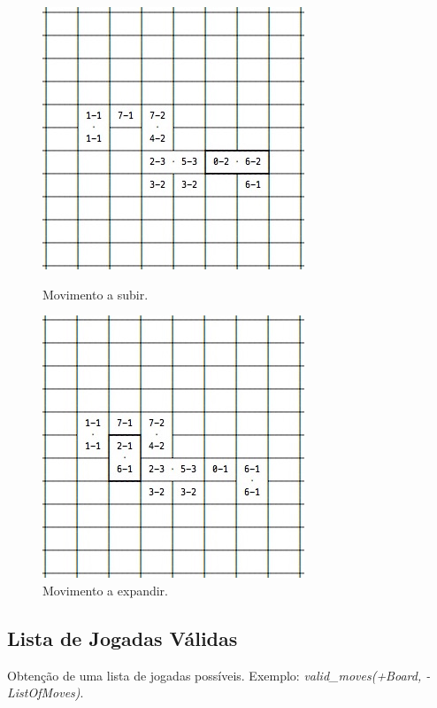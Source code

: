 \documentclass[a4paper]{article}
\begin{document}
\begin{figure}[ht]
 \begin{minipage}[t]{.5\textwidth}
	\begin{center}
		\includegraphics[scale=0.6]{inter_climb.jpg}
		\caption{Movimento a subir.}
		\label{inter_climb}
	\end{center}
 \end{minipage}
 \begin{minipage}[t]{.5\textwidth}
	\begin{center}
		\includegraphics[scale=0.6]{inter_expand.jpg}
		\caption{Movimento a expandir.}
		\label{inter_expand}
	\end{center}
 \end{minipage}
\end{figure}

\subsection{Lista de Jogadas Válidas} Obtenção de uma lista de jogadas possíveis. Exemplo: \textit{valid\_moves(+Board, -ListOfMoves)}.
\end{document}
